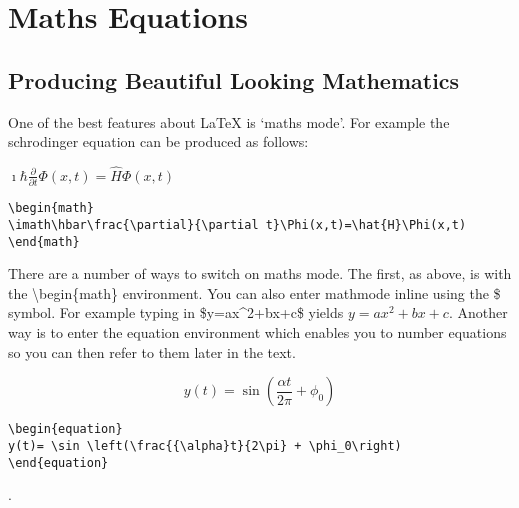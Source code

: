 \chapter{Maths Equations}

\section{Producing Beautiful Looking Mathematics}

One of the best features about LaTeX is `maths mode'.  For example the schrodinger equation can be produced as follows:

\vspace*{2ex}

\begin{center}
\begin{math}
\imath\hbar\frac{\partial}{\partial t}\Phi (x, t) = \hat{H}\Phi (x, t)
\end{math}
\end{center}

\vspace*{2ex}

\begin{verbatim}
\begin{math}
\imath\hbar\frac{\partial}{\partial t}\Phi(x,t)=\hat{H}\Phi(x,t)
\end{math}
\end{verbatim}

There are a number of ways to switch on maths mode.  The first, as above, is with the {\textbackslash}begin\{math\} environment. You can also enter mathmode inline using the \$ symbol. For example typing in \$y=ax\textasciicircum{}2+bx+c\$ yields $y=ax^2+bx+c$.  Another way is to enter the equation environment which enables you to number equations so you can then refer to them later in the text.

\begin{equation}
y(t)= \sin \left(\frac{{\alpha}t}{2\pi} + \phi_0\right)
\label{eqn:MadeUpNonsense}
\end{equation}

\vspace*{2ex}
\begin{verbatim}
\begin{equation}
y(t)= \sin \left(\frac{{\alpha}t}{2\pi} + \phi_0\right)
\end{equation}
\end{verbatim}.

